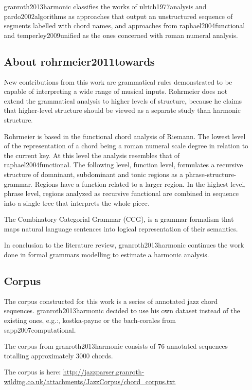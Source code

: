 			granroth2013harmonic classifies the works of ulrich1977analysis and pardo2002algorithms as approaches that output an unstructured sequence of segments labelled with chord names, and approaches from raphael2004functional and temperley2009unified as the ones concerned with roman numeral analysis.

		\subsection{About rohrmeier2011towards}
			New contributions from this work are grammatical rules demonstrated to be capable of interpreting a wide range of musical inputs. Rohrmeier does not extend the grammatical analysis to higher levels of structure, because he claims that higher-level structure should be viewed as a separate study than harmonic structure.

			Rohrmeier is based in the functional chord analysis of Riemann. The lowest level of the representation of a chord being a roman numeral scale degree in relation to the current key. At this level the analysis resembles that of raphael2004functional. The following level, function level, formulates a recursive structure of domninant, subdominant and tonic regions as a phrase-structure-grammar. Regions have a function related to a larger region. In the highest level, phrase level, regions analyzed as recursive functional are combined in sequence into a single tree that interprets the whole piece.

			The Combinatory Categorial Grammar (CCG), is a grammar formalism that maps natural language sentences into logical representation of their semantics.

			In conclusion to the literature review, granroth2013harmonic continues the work done in formal grammars modelling to estimate a harmonic analysis.

		\subsection{Corpus}
			The corpus constructed for this work is a series of annotated jazz chord sequences. granroth2013harmonic decided to use his own dataset instead of the existing ones, e.g.:, kostka-payne or the bach-corales from sapp2007computational.

			The corpus from granroth2013harmonic consists of 76 annotated sequences totalling approximately 3000 chords.

			The corpus is here:\newline
			\url{http://jazzparser.granroth-wilding.co.uk/attachments/JazzCorpus/chord_corpus.txt}

